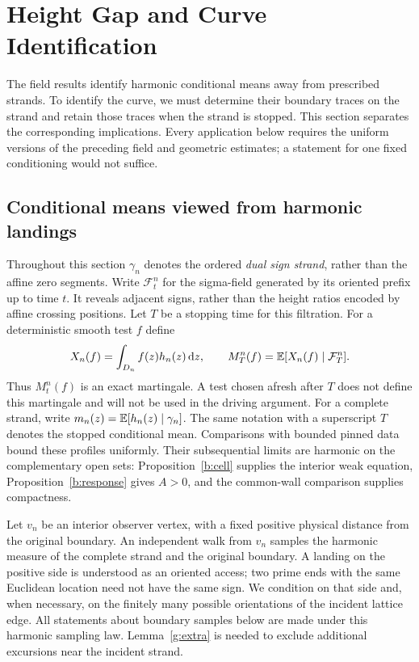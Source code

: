 \section{Height Gap and Curve Identification}\label{sec:interface}

The field results identify harmonic conditional means away from prescribed
strands. To identify the curve, we must determine their boundary traces on
the strand and retain those traces when the strand is stopped. This section
separates the corresponding implications. Every application below requires
the uniform versions of the preceding field and geometric estimates; a
statement for one fixed conditioning would not suffice.

\subsection{Conditional means viewed from harmonic landings}

Throughout this section $\gamma_n$ denotes the ordered \emph{dual sign
strand}, rather than the affine zero segments. Write $\mathcal F^n_t$
for the sigma-field generated by its oriented prefix up to time $t$.
It reveals adjacent signs, rather than the height ratios encoded by
affine crossing positions. Let $T$ be a stopping time for this filtration.
For a deterministic smooth test $f$ define
\[
 X_n(f)=\int_{D_n}f(z)h_n(z)\,\mathrm d z,\qquad
 M^n_T(f)=\mathbb E[X_n(f)\mid\mathcal F^n_T].
\]
Thus $M^n_t(f)$ is an exact martingale. A test chosen afresh after $T$ does
not define this martingale and will not be used in the driving argument.
For a complete strand, write
$m_n(z)=\mathbb E[h_n(z)\mid\gamma_n]$.
The same notation with a superscript $T$ denotes the stopped conditional
mean. Comparisons with bounded pinned data bound these profiles uniformly.
Their subsequential limits are harmonic on the complementary open sets:
Proposition~\ref{b:cell} supplies the interior weak equation,
Proposition~\ref{b:response} gives $A>0$, and the common-wall comparison
supplies compactness.

Let $v_n$ be an interior observer vertex, with a fixed positive physical
distance from the original boundary. An independent walk from $v_n$
samples the harmonic measure
of the complete strand and the original boundary. A landing on the
positive side is understood as an oriented access; two prime ends with the
same Euclidean location need not have the same sign. We condition on that
side and, when necessary, on the finitely many possible orientations of
the incident lattice edge. All statements about boundary samples below are
made under this harmonic sampling law. Lemma~\ref{g:extra} is needed to
exclude additional excursions near the incident strand.


